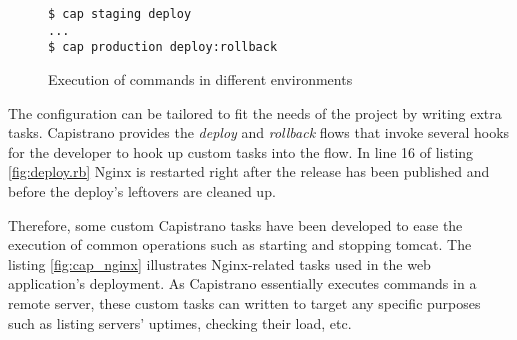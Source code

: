 \begin{figure}[h]
  \texttt{\$ cap staging deploy}\\
  \texttt{...}\\
  \texttt{\$ cap production deploy:rollback}\\
  \caption{Execution of commands in different environments}
  \label{fig:capistrano}
\end{figure}

The configuration can be tailored to fit the needs of the project by writing extra tasks. Capistrano provides the \textit{deploy} and \textit{rollback} flows that invoke several hooks for the developer to hook up custom tasks into the flow. In line 16 of listing \ref{fig:deploy.rb} Nginx is restarted right after the release has been published and before the deploy's leftovers are cleaned up.

Therefore, some custom Capistrano tasks have been developed to ease the execution of common operations such as starting and stopping tomcat. The listing \ref{fig:cap_nginx} illustrates Nginx-related tasks used in the web application's deployment. As Capistrano essentially executes commands in a remote server, these custom tasks can written to target any specific purposes such as listing servers' uptimes, checking their load, etc.


